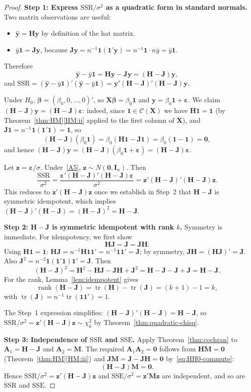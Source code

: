 \documentclass[14pt]{extarticle}
\theoremstyle{plain}
\theoremstyle{definition}
\theoremstyle{remark}
\DeclareMathOperator\tr{tr}
\DeclareMathOperator\rank{rank}
\newcommand{\SSR}{\mathrm{SSR}}
\newcommand{\SSE}{\mathrm{SSE}}
\newcommand{\bX}{\mathbf{X}}
\newcommand{\by}{\mathbf{y}}
\def\bb{\boldsymbol{\beta}}
\newcommand{\be}{\boldsymbol{\varepsilon}}
\newcommand{\bI}{\mathbf{I}}
\newcommand{\bH}{\mathbf{H}}
\newcommand{\bM}{\mathbf{M}}
\newcommand{\bone}{\mathbf{1}}
\newcommand{\bzero}{\mathbf{0}}
\newcommand{\bz}{\mathbf{z}}
\newcommand{\bA}{\mathbf{A}}
\newcommand{\calC}{\mathcal{C}}
\newcommand{\bJ}{\mathbf{J}}
\begin{document}
\begin{proof}
\textbf{Step 1: Express $\SSR/\sigma^2$ as a quadratic form in standard normals.} Two matrix observations are useful:
\begin{itemize}
\item $\hat{\by} = \bH\by$ by definition of the hat matrix.
\item $\bar{y}\bone = \bJ\by$, because $\bJ\by = n^{-1}\bone(\bone'\by) = n^{-1}\bone \cdot n\bar{y} = \bar{y}\bone$.
\end{itemize}
Therefore
\[
\hat{\by} - \bar{y}\bone = \bH\by - \bJ\by = (\bH - \bJ)\by,
\]
and $\SSR = (\hat{\by} - \bar{y}\bone)'(\hat{\by} - \bar{y}\bone) = \by'(\bH - \bJ)'(\bH - \bJ)\by$.

Under $H_0$, $\bb = (\beta_0, 0, \ldots, 0)'$, so $\bX\bb = \beta_0\bone$ and $\by = \beta_0\bone + \be$. We claim $(\bH - \bJ)\by = (\bH - \bJ)\be$: indeed, since $\bone \in \calC(\bX)$ we have $\bH\bone = \bone$ (by Theorem~\ref{thm:HM}\ref{HM:ii} applied to the first column of $\bX$), and $\bJ\bone = n^{-1}\bone(\bone'\bone) = \bone$, so
\[
(\bH - \bJ)(\beta_0\bone) = \beta_0(\bH\bone - \bJ\bone) = \beta_0(\bone - \bone) = \bzero,
\]
and hence $(\bH - \bJ)\by = (\bH - \bJ)(\beta_0\bone + \be) = (\bH - \bJ)\be$.

Let $\bz = \be/\sigma$. Under~\ref{A5}, $\bz \sim N(\bzero, \bI_n)$. Then
\[
\frac{\SSR}{\sigma^2} = \frac{\be'(\bH - \bJ)'(\bH - \bJ)\be}{\sigma^2} = \bz'(\bH - \bJ)'(\bH - \bJ)\bz.
\]
This reduces to $\bz'(\bH - \bJ)\bz$ once we establish in Step~2 that $\bH - \bJ$ is symmetric idempotent, which implies $(\bH - \bJ)'(\bH - \bJ) = (\bH - \bJ)^2 = \bH - \bJ$.

\textbf{Step 2: $\bH - \bJ$ is symmetric idempotent with rank $k$.} Symmetry is immediate. For idempotency, we first show
\begin{equation}\label{eq:HH0-commute}
\bH\bJ = \bJ = \bJ\bH.
\end{equation}
Using $\bH\bone = \bone$: $\bH\bJ = n^{-1}\bH\bone\bone' = n^{-1}\bone\bone' = \bJ$; by symmetry, $\bJ\bH = (\bH\bJ)' = \bJ$. Also $\bJ^2 = n^{-2}\bone(\bone'\bone)\bone' = \bJ$. Then
\[
(\bH - \bJ)^2 = \bH^2 - \bH\bJ - \bJ\bH + \bJ^2 = \bH - \bJ - \bJ + \bJ = \bH - \bJ.
\]
For the rank, Lemma~\ref{lem:idempotent} gives
\[
\rank(\bH - \bJ) = \tr(\bH) - \tr(\bJ) = (k+1) - 1 = k,
\]
with $\tr(\bJ) = n^{-1}\tr(\bone\bone') = 1$.

The Step~1 expression simplifies: $(\bH - \bJ)'(\bH - \bJ) = \bH - \bJ$, so $\SSR/\sigma^2 = \bz'(\bH - \bJ)\bz \sim \chi^2_k$ by Theorem~\ref{thm:quadratic-chisq}.

\textbf{Step 3: Independence of $\SSR$ and $\SSE$.} Apply Theorem~\ref{thm:cochran} to $\bA_1 = \bH - \bJ$ and $\bA_2 = \bM$. The required $\bA_1\bA_2 = \bzero$ follows from $\bH\bM = \bzero$ (Theorem~\ref{thm:HM}\ref{HM:iii}) and $\bJ\bM = \bJ - \bJ\bH = \bzero$ by~\eqref{eq:HH0-commute}:
\[
(\bH - \bJ)\bM = \bzero.
\]
Hence $\SSR/\sigma^2 = \bz'(\bH - \bJ)\bz$ and $\SSE/\sigma^2 = \bz'\bM\bz$ are independent, and so are $\SSR$ and $\SSE$.
\end{proof}
\end{document}
